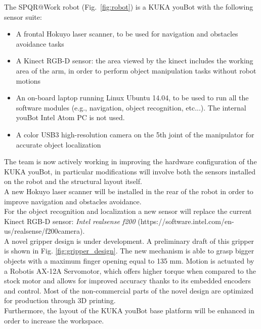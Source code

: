 \documentclass{llncs}
\begin{document}
The SPQR@Work robot (Fig.~\ref{fig:robot}) is a KUKA youBot with the following sensor suite:

\begin{itemize}
 \item A frontal Hokuyo laser scanner, to be used for navigation and obstacles avoidance tasks
 \item A Kinect RGB-D sensor: the area viewed by the kinect includes the working area of the arm, in order to perform object manipulation tasks without robot motions
 \item An on-board laptop running Linux Ubuntu 14.04, to be used to run all the software modules (e.g., navigation, object recognition, etc...). The internal youBot Intel Atom PC is not used.
 \item A color USB3 high-resolution camera on the 5th joint of the manipulator for accurate object localization
\end{itemize}

The team is now actively working in improving the hardware configuration of the KUKA youBot, in particular modifications will involve both the sensors installed on the robot and the structural layout itself.\\
A new Hokuyo laser scanner will be installed in the rear of the robot in order to improve navigation and obstacles avoidance.\\
For the object recognition and localization a new sensor will replace the current Kinect RGB-D sensor: \emph{Intel realsense f200} (https://software.intel.com/en-us/realsense/f200camera).\\
A novel gripper design is under development. A preliminary draft of this gripper is shown in Fig. \ref{fig:gripper_design}. The new mechanism is able to grasp bigger objects with a maximum finger opening equal to 135 mm. Motion is actuated by a Robotis AX-12A Servomotor, which offers higher torque when compared to the stock motor and allows for improved accuracy thanks to its embedded encoders and control. Most of the non-commercial parts of the novel design are optimized for production through 3D printing.
\\Furthermore, the layout of the KUKA youBot base platform will be enhanced in order to increase the workspace.
\end{document}
